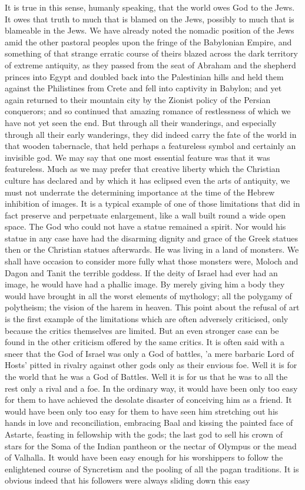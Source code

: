 It is true in this sense, humanly speaking, that the world owes God to the Jews. It owes that truth to much that is blamed on the Jews, possibly to much that is blameable in the Jews. We have already noted the nomadic position of the Jews amid the other pastoral peoples upon the fringe of the Babylonian Empire, and something of that strange erratic course of theirs blazed across the dark territory of extreme antiquity, as they passed from the seat of Abraham and the shepherd princes into Egypt and doubled back into the Palestinian hills and held them against the Philistines from Crete and fell into captivity in Babylon; and yet again returned to their mountain city by the Zionist policy of the Persian conquerors; and so continued that amazing romance of restlessness of which we have not yet seen the end. But through all their wanderings, and especially through all their early wanderings, they did indeed carry the fate of the world in that wooden tabernacle, that held perhaps a featureless symbol and certainly an invisible god. We may say that one most essential feature was that it was featureless. Much as we may prefer that creative liberty which the Christian culture has declared and by which it has eclipsed even the arts of antiquity, we must not underrate the determining importance at the time of the Hebrew inhibition of images. It is a typical example of one of those limitations that did in fact preserve and perpetuate enlargement, like a wall built round a wide open space. The God who could not have a statue remained a spirit. Nor would his statue in any case have had the disarming dignity and grace of the Greek statues then or the Christian statues afterwards. He was living in a land of monsters. We shall have occasion to consider more fully what those monsters were, Moloch and Dagon and Tanit the terrible goddess. If the deity of Israel had ever had an image, he would have had a phallic image. By merely giving him a body they would have brought in all the worst elements of mythology; all the polygamy of polytheism; the vision of the harem in heaven. This point about the refusal of art is the first example of the limitations which are often adversely criticised, only because the critics themselves are limited. But an even stronger case can be found in the other criticism offered by the same critics. It is often said with a sneer that the God of Israel was only a God of battles, 'a mere barbaric Lord of Hosts' pitted in rivalry against other gods only as their envious foe. Well it is for the world that he was a God of Battles. Well it is for us that he was to all the rest only a rival and a foe. In the ordinary way, it would have been only too easy for them to have achieved the desolate disaster of conceiving him as a friend. It would have been only too easy for them to have seen him stretching out his hands in love and reconciliation, embracing Baal and kissing the painted face of Astarte, feasting in fellowship with the gods; the last god to sell his crown of stars for the Soma of the Indian pantheon or the nectar of Olympus or the mead of Valhalla. It would have been easy enough for his worshippers to follow the enlightened course of Syncretism and the pooling of all the pagan traditions. It is obvious indeed that his followers were always sliding down this easy 